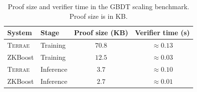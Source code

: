 \begin{table}[t]
    \centering
    \caption{Proof size and verifier time in the GBDT scaling benchmark.
    Proof size is in KB.}
    \label{tab:proof-size-verifier}
    \begin{tabular}{llcc}
        \toprule
        System & Stage & Proof size (KB) & Verifier time (s) \\
        \midrule
        \textsc{Terrae} & Training & $70.8$ & $\approx 0.13$ \\
        ZKBoost & Training & $12.5$ & $\approx 0.03$ \\
        \textsc{Terrae} & Inference & $3.7$ & $\approx 0.10$ \\
        ZKBoost & Inference & $2.7$ & $\approx 0.01$ \\
        \bottomrule
    \end{tabular}
\end{table}
